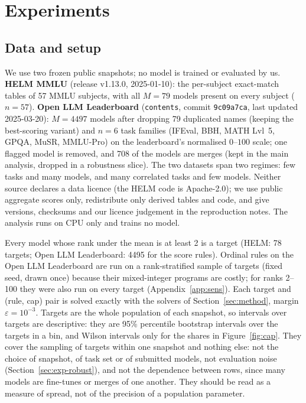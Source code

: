 \section{Experiments}
\label{sec:exp}

\subsection{Data and setup}
\label{sec:data}

We use two frozen public snapshots; no model is trained or evaluated by us. \textbf{HELM MMLU} (release v1.13.0, 2025-01-10): the per-subject exact-match tables of 57 MMLU subjects, with all $M=79$ models present on every subject ($n=57$). \textbf{Open LLM Leaderboard} (\texttt{contents}, commit \texttt{9c09a7ca}, last updated 2025-03-20): $M=4497$ models after dropping 79 duplicated names (keeping the best-scoring variant) and $n=6$ task families (IFEval, BBH, MATH Lvl~5, GPQA, MuSR, MMLU-Pro) on the leaderboard's normalised $0$--$100$ scale; one flagged model is removed, and 708 of the models are merges (kept in the main analysis, dropped in a robustness slice). The two datasets span two regimes: few tasks and many models, and many correlated tasks and few models. Neither source declares a data licence (the HELM code is Apache-2.0); we use public aggregate scores only, redistribute only derived tables and code, and give versions, checksums and our licence judgement in the reproduction notes. The analysis runs on CPU only and trains no model.

Every model whose rank under the mean is at least 2 is a target (HELM: 78 targets; Open LLM Leaderboard: 4495 for the score rules). Ordinal rules on the Open LLM Leaderboard are run on a rank-stratified sample of targets (fixed seed, drawn once) because their mixed-integer programs are costly; for ranks 2--100 they were also run on every target (Appendix~\ref{app:sens}). Each target and (rule, cap) pair is solved exactly with the solvers of Section~\ref{sec:method}, margin $\varepsilon=10^{-3}$. Targets are the whole population of each snapshot, so intervals over targets are descriptive: they are 95\% percentile bootstrap intervals over the targets in a bin, and Wilson intervals only for the shares in Figure~\ref{fig:cap}. They cover the sampling of targets within one snapshot and nothing else: not the choice of snapshot, of task set or of submitted models, not evaluation noise (Section~\ref{sec:exp-robust}), and not the dependence between rows, since many models are fine-tunes or merges of one another. They should be read as a measure of spread, not of the precision of a population parameter.

